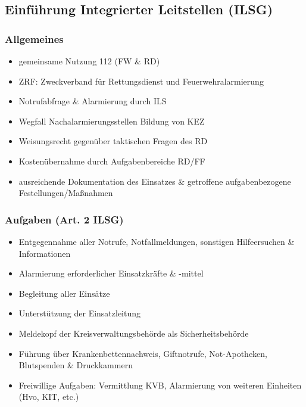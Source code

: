 \subsection{Einführung Integrierter Leitstellen (ILSG)}
\begin{normbox}{\subsubsection{Allgemeines}}
    \begin{itemize}
        \item gemeinsame Nutzung 112 (FW \& RD)
        \item ZRF: Zweckverband für Rettungsdienst und Feuerwehralarmierung
        \item Notrufabfrage \& Alarmierung durch ILS
        \item Wegfall Nachalarmierungsstellen \ra Bildung von KEZ
        \item Weisungsrecht gegenüber taktischen Fragen des RD
        \item Kostenübernahme durch Aufgabenbereiche RD/FF
        \item ausreichende Dokumentation des Einsatzes \& getroffene aufgabenbezogene Festellungen/Maßnahmen
    \end{itemize}
\end{normbox}
\begin{normbox}{\subsubsection{Aufgaben (Art. 2 ILSG)}}
    \begin{itemize}
        \item Entgegennahme aller Notrufe, Notfallmeldungen, sonstigen Hilfeersuchen \& Informationen
        \item Alarmierung erforderlicher Einsatzkräfte \& -mittel
        \item Begleitung aller Einsätze
        \item Unterstützung der Einsatzleitung
        \item Meldekopf der Kreisverwaltungsbehörde als Sicherheitsbehörde
        \item Führung über Krankenbettennachweis, Giftnotrufe, Not-Apotheken, Blutspenden \& Druckkammern
        \item Freiwillige Aufgaben: Vermittlung KVB, Alarmierung von weiteren Einheiten (Hvo, KIT, etc.)
    \end{itemize}
\end{normbox}
